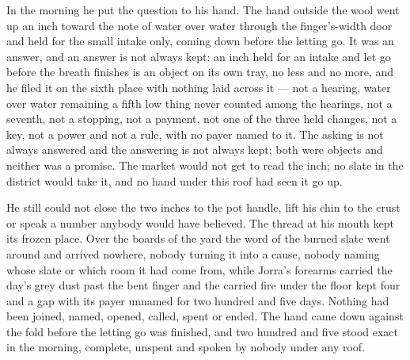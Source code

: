 In the morning he put the question to his hand. The hand outside the wool went up an inch toward the note of water over water through the finger's-width door and held for the small intake only, coming down before the letting go. It was an answer, and an answer is not always kept: an inch held for an intake and let go before the breath finishes is an object on its own tray, no less and no more, and he filed it on the sixth place with nothing laid across it --- not a hearing, water over water remaining a fifth low thing never counted among the hearings, not a seventh, not a stopping, not a payment, not one of the three held changes, not a key, not a power and not a rule, with no payer named to it. The asking is not always answered and the answering is not always kept; both were objects and neither was a promise. The market would not get to read the inch; no slate in the district would take it, and no hand under this roof had seen it go up.

He still could not close the two inches to the pot handle, lift his chin to the crust or speak a number anybody would have believed. The thread at his mouth kept its frozen place. Over the boards of the yard the word of the burned slate went around and arrived nowhere, nobody turning it into a cause, nobody naming whose slate or which room it had come from, while Jorra's forearms carried the day's grey dust past the bent finger and the carried fire under the floor kept four and a gap with its payer unnamed for two hundred and five days. Nothing had been joined, named, opened, called, spent or ended. The hand came down against the fold before the letting go was finished, and two hundred and five stood exact in the morning, complete, unspent and spoken by nobody under any roof.
